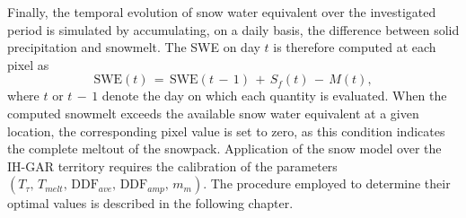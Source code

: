 Finally, the temporal evolution of snow water equivalent over the investigated period is simulated by accumulating, on a daily basis, the difference 
between solid precipitation and snowmelt. The SWE on day $t$ is therefore computed at each pixel as 
\begin{equation}
    \text{SWE}(t)\,=\,\text{SWE}(t\,-\,1)\,+\,S_{f}(t)\,-\,M(t), 
    \label{eq:swe_swe}
\end{equation}
where $t$ or $t\,-\,1$ denote the day on which each quantity is evaluated. When the computed snowmelt exceeds the available snow water equivalent at a 
given location, the corresponding pixel value is set to zero, as this condition indicates the complete meltout of the snowpack. Application of the snow 
model over the IH-GAR territory requires the calibration of the parameters $\left(T_{\tau},\,T_{melt},\,\text{DDF}_{ave},\,\text{DDF}_{amp},\,m_m \right)$. 
The procedure employed to determine their optimal values is described in the following chapter.
